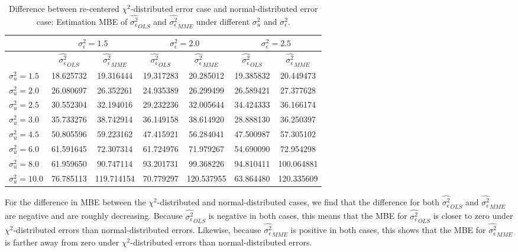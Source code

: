 \documentclass{article}
\begin{document}
\begin{table}[ht]
    \centering
    \caption{Difference between re-centered $\chi^2$-distributed error case and normal-distributed error case: Estimation MBE of $\hat{\sigma^2_\epsilon}_{OLS}$ and $\hat{\sigma^2_\epsilon}_{MME}$ under different $\sigma^2_u$ and $\sigma^2_\epsilon$.}
    \label{Tab:MSE_sigma_diff_chi}
    \begin{tabular}[t]{lcccccc}
        \hline
        &\multicolumn{2}{c}{$\sigma^2_\epsilon=1.5$}&\multicolumn{2}{c}{$\sigma^2_\epsilon=2.0$}&\multicolumn{2}{c}{$\sigma^2_\epsilon=2.5$}\\
        \hline
        &$\hat{\sigma^2_\epsilon}_{OLS}$&$\hat{\sigma^2_\epsilon}_{MME}$&$\hat{\sigma^2_\epsilon}_{OLS}$&
        $\hat{\sigma^2_\epsilon}_{MME}$&$\hat{\sigma^2_\epsilon}_{OLS}$&$\hat{\sigma^2_\epsilon}_{MME}$\\
        \hline
        $\sigma^2_u = 1.5$&18.625732&19.316444&19.317283&20.285012&19.385832&20.449473\\
        $\sigma^2_u = 2.0$&26.080697&26.352261&24.935389&26.299499&26.589421&27.377628\\
        $\sigma^2_u = 2.5$&30.552304&32.194016&29.232236&32.005644&34.424333&36.166174\\
        $\sigma^2_u = 3.0$&35.733276&38.742914&36.149158&38.614920&28.888130&36.250397\\
        $\sigma^2_u = 4.5$&50.805596&59.223162&47.415921&56.284041&47.500987&57.305102\\
        $\sigma^2_u = 6.0$&61.591645&72.307314&61.724976&71.979267&54.690090&72.954298\\
        $\sigma^2_u = 8.0$&61.959650&90.747114&93.201731&99.368226&94.810411&100.064881\\
        $\sigma^2_u = 10.0$&76.785113&119.714154&70.779297&120.537955&63.864480&120.335609\\
        \hline
    \end{tabular}
\end{table}

For the difference in MBE between the $\chi^2$-distributed and normal-distributed cases,
we find that the difference for both $\hat{\sigma^2_\epsilon}_{OLS}$ and $\hat{\sigma^2_\epsilon}_{MME}$ are negative and are roughly decreasing. 
Because $\hat{\sigma^2_\epsilon}_{OLS}$ is negative in both cases, this means that the MBE for $\hat{\sigma^2_\epsilon}_{OLS}$ is closer to zero under $\chi^2$-distributed errors than normal-distributed errors.
Likewise, because $\hat{\sigma^2_\epsilon}_{MME}$ is positive in both cases, this shows that the MBE for $\hat{\sigma^2_\epsilon}_{MME}$ is farther away from zero under $\chi^2$-distributed errors than normal-distributed errors.
\end{document}
